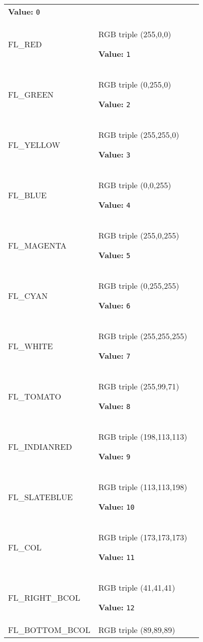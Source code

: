 \begin{longtable}{|p{\varnamewidth}|p{\vardescrwidth}|l}
\textbf{Value:} 
{\tt 0}&\\
\cline{1-2}
\raggedright F\-L\-\_\-R\-E\-D\- & \raggedright RGB triple (255,0,0)

\textbf{Value:} 
{\tt 1}&\\
\cline{1-2}
\raggedright F\-L\-\_\-G\-R\-E\-E\-N\- & \raggedright RGB triple (0,255,0)

\textbf{Value:} 
{\tt 2}&\\
\cline{1-2}
\raggedright F\-L\-\_\-Y\-E\-L\-L\-O\-W\- & \raggedright RGB triple (255,255,0)

\textbf{Value:} 
{\tt 3}&\\
\cline{1-2}
\raggedright F\-L\-\_\-B\-L\-U\-E\- & \raggedright RGB triple (0,0,255)

\textbf{Value:} 
{\tt 4}&\\
\cline{1-2}
\raggedright F\-L\-\_\-M\-A\-G\-E\-N\-T\-A\- & \raggedright RGB triple (255,0,255)

\textbf{Value:} 
{\tt 5}&\\
\cline{1-2}
\raggedright F\-L\-\_\-C\-Y\-A\-N\- & \raggedright RGB triple (0,255,255)

\textbf{Value:} 
{\tt 6}&\\
\cline{1-2}
\raggedright F\-L\-\_\-W\-H\-I\-T\-E\- & \raggedright RGB triple (255,255,255)

\textbf{Value:} 
{\tt 7}&\\
\cline{1-2}
\raggedright F\-L\-\_\-T\-O\-M\-A\-T\-O\- & \raggedright RGB triple (255,99,71)

\textbf{Value:} 
{\tt 8}&\\
\cline{1-2}
\raggedright F\-L\-\_\-I\-N\-D\-I\-A\-N\-R\-E\-D\- & \raggedright RGB triple (198,113,113)

\textbf{Value:} 
{\tt 9}&\\
\cline{1-2}
\raggedright F\-L\-\_\-S\-L\-A\-T\-E\-B\-L\-U\-E\- & \raggedright RGB triple (113,113,198)

\textbf{Value:} 
{\tt 10}&\\
\cline{1-2}
\raggedright F\-L\-\_\-C\-O\-L\-1\- & \raggedright RGB triple (173,173,173)

\textbf{Value:} 
{\tt 11}&\\
\cline{1-2}
\raggedright F\-L\-\_\-R\-I\-G\-H\-T\-\_\-B\-C\-O\-L\- & \raggedright RGB triple (41,41,41)

\textbf{Value:} 
{\tt 12}&\\
\cline{1-2}
\raggedright F\-L\-\_\-B\-O\-T\-T\-O\-M\-\_\-B\-C\-O\-L\- & \raggedright RGB triple (89,89,89)


\end{longtable}
